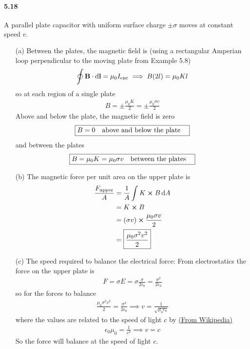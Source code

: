 \documentclass[../main.tex]{subfiles}
\begin{document}
\newpage
\paragraph{5.18} A parallel plate capacitor with uniform surface charge $\pm \sigma$ moves at constant
speed $v$.
\begin{itemize}
    \item [(a)] Between the plates, the magnetic field is (using a rectangular Amperian loop perpendicular to the moving plate from Example 5.8)
    \begin{align*}
        \oint \vb B \cdot \dd{\vb l} = \mu_0 I_\text{enc} \implies B(2l) = \mu_0 K l
    \end{align*}
    so at each region of a single plate
    \begin{align*}
        B = \pm \frac{\mu_0 K}{2} = \pm \frac{\mu_0 \sigma v}{2}
    \end{align*}
    Above and below the plate, the magnetic field is zero
    \begin{align*}
        \boxed{
            B = 0 \qqtext{above and below the plate}
        }
    \end{align*}
    and between the plates
    \begin{align*}
        \boxed{
            B = \mu_0 K = \mu_0 \sigma v \qqtext{between the plates}
        }
    \end{align*}
    \item [(b)] The magnetic force per unit area on the upper plate is
    \begin{align*}
        \frac{F_\text{upper}}{A} &= \frac{1}{A} \int K \cross B \dd{A} \\
        &= K \cross B \\
        &= (\sigma v) \cross \frac{\mu_0 \sigma v}{2} \\
        &= \boxed{
            \frac{\mu_0 \sigma^2 v^2}{2}
        }
    \end{align*}
    \item [(c)] The speed required to balance the electrical force: From electrostatics the force on the upper plate is
    \begin{align*}
        F = \sigma E = \sigma \frac{\sigma}{2\epsilon_0} = \frac{\sigma^2}{2\epsilon_0}
    \end{align*}
    so for the forces to balance
    \begin{align*}
        \frac{\mu_0 \sigma^2 v^2}{2} = \frac{\sigma^2}{2\epsilon_0} \implies v = \frac{1}{\sqrt{\mu_0 \epsilon_0}}
    \end{align*}
    where the values are related to the speed of light $c$ by \href{https://en.wikipedia.org/wiki/Vacuum_permittivity#Value}{(From Wikipedia)}
    \begin{align*}
        \epsilon_0 \mu_0 = \frac{1}{c^2} \implies v = c
    \end{align*}
    So the force will balance at the speed of light $c$.
\end{itemize}
\end{document}
